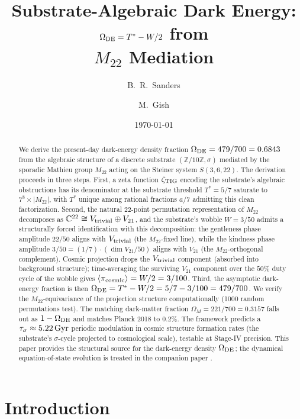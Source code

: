 \documentclass[11pt,reqno]{amsart}
\title[Substrate-Algebraic Dark Energy via $M_{22}$]{Substrate-Algebraic
Dark Energy:\\$\Omega_{\rm DE} = T^* - W/2$ from\\$M_{22}$ Mediation}
\author{B.~R.~Sanders}
\author{M.~Gish}
\date{\today}
\theoremstyle{plain}
\theoremstyle{definition}
\theoremstyle{remark}
\newcommand{\zTIG}{\zeta_{\rm TIG}}
\newcommand{\Mtwentytwo}{M_{22}}
\newcommand{\Vtriv}{V_{\rm trivial}}
\newcommand{\Vtwentyone}{V_{21}}
\newcommand{\Tstar}{T^*}
\newcommand{\Whalf}{W/2}
\newcommand{\OmegaDE}{\Omega_{\rm DE}}
\begin{document}
\begin{abstract}
We derive the present-day dark-energy density fraction $\OmegaDE =
479/700 = 0.6843$ from the algebraic structure of a discrete substrate
$(\mathbb{Z}/10\mathbb{Z}, \sigma)$ mediated by the sporadic Mathieu
group $\Mtwentytwo$ acting on the Steiner system $S(3, 6, 22)$. The
derivation proceeds in three steps. First, a zeta function $\zTIG$
encoding the substrate's algebraic obstructions has its denominator at
the substrate threshold $\Tstar = 5/7$ saturate to $7^8 \times
|\Mtwentytwo|$, with $\Tstar$ unique among rational fractions $a/7$
admitting this clean factorization. Second, the natural $22$-point
permutation representation of $\Mtwentytwo$ decomposes as $\mathbb{C}^{22}
\cong \Vtriv \oplus \Vtwentyone$, and the substrate's wobble
$W = 3/50$ admits a structurally forced identification with this
decomposition: the gentleness phase amplitude $22/50$ aligns with
$\Vtriv$ (the $\Mtwentytwo$-fixed line), while the kindness phase
amplitude $3/50 = (1/7)\cdot(\dim \Vtwentyone / 50)$ aligns with
$\Vtwentyone$ (the $\Mtwentytwo$-orthogonal complement). Cosmic
projection drops the $\Vtriv$ component (absorbed into background
structure); time-averaging the surviving $\Vtwentyone$ component over
the $50\%$ duty cycle of the wobble gives $\langle\pi_{\rm cosmic}\rangle
= W/2 = 3/100$. Third, the asymptotic dark-energy fraction is then
$\OmegaDE = \Tstar - \Whalf = 5/7 - 3/100 = 479/700$. We verify the
$\Mtwentytwo$-equivariance of the projection structure computationally
(1000 random permutations test). The matching dark-matter
fraction $\Omega_M = 221/700 = 0.3157$ falls out as
$1 - \OmegaDE$ and matches Planck 2018 to $0.2\%$. The framework
predicts a $\tau_\sigma \approx 5.22\,{\rm Gyr}$ periodic modulation
in cosmic structure formation rates (the substrate's $\sigma$-cycle
projected to cosmological scale), testable at Stage-IV precision. This
paper provides the structural source for the dark-energy density
$\OmegaDE$; the dynamical equation-of-state evolution is treated in
the companion paper \cite{SandersGishLogQuint2026}.
\end{abstract}

\maketitle

\section{Introduction}\label{sec:introduction}
\end{document}
